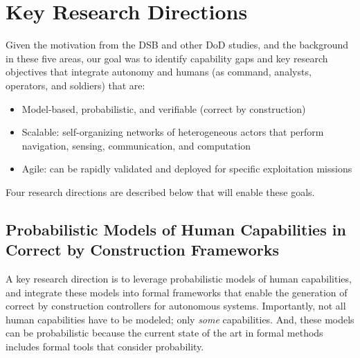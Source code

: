 
\section*{Key Research Directions}

%

Given the motivation from the DSB and other DoD studies, and the background in these five areas, our goal was to identify capability gaps and key research objectives that integrate autonomy and humans (as command, analysts, operators, and soldiers) that are:\vspace*{-0.1 in}
\begin{itemize}
\item Model-based, probabilistic, and verifiable (correct by construction)\vspace*{-0.1 in}
\item Scalable: self-organizing networks of heterogeneous actors that perform navigation, sensing, communication, and computation\vspace*{-0.1 in}
\item Agile: can be rapidly validated and deployed for specific exploitation missions\vspace*{-0.1 in}
\end{itemize}

Four research directions are described below that will enable these goals. 

\subsection*{Probabilistic Models of Human Capabilities in Correct by Construction Frameworks}

A key research direction is to leverage probabilistic models of human capabilities, and integrate these models into formal frameworks that enable the generation of correct by construction controllers for autonomous systems. Importantly, not all human capabilities have to be modeled; only {\it some} capabilities. And, these models can be probabilistic because the current state of the art in formal methods includes formal tools that consider probability. 

